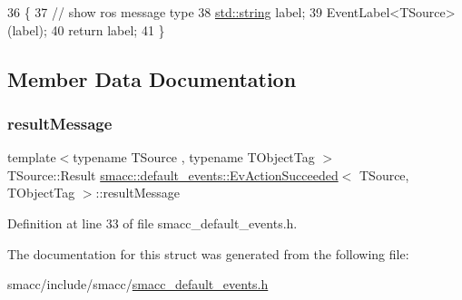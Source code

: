 \begin{DoxyCode}
36   \{
37     \textcolor{comment}{// show ros message type}
38     \hyperlink{namespacetesting_1_1internal_a8e8ff5b11e64078831112677156cb111}{std::string} label;
39     EventLabel<TSource>(label);
40     \textcolor{keywordflow}{return} label;
41   \}
\end{DoxyCode}


\subsection{Member Data Documentation}
\mbox{\label{structsmacc_1_1default__events_1_1EvActionSucceeded_a5178997ebcf9a7a738e0bda57bd658d1}} 
\subsubsection{\texorpdfstring{result\+Message}{resultMessage}}
{\footnotesize\ttfamily template$<$typename T\+Source , typename T\+Object\+Tag $>$ \\
T\+Source\+::\+Result \hyperlink{structsmacc_1_1default__events_1_1EvActionSucceeded}{smacc\+::default\+\_\+events\+::\+Ev\+Action\+Succeeded}$<$ T\+Source, T\+Object\+Tag $>$\+::result\+Message}



Definition at line 33 of file smacc\+\_\+default\+\_\+events.\+h.



The documentation for this struct was generated from the following file\+:\begin{DoxyCompactItemize}
\item 
smacc/include/smacc/\hyperlink{smacc__default__events_8h}{smacc\+\_\+default\+\_\+events.\+h}\end{DoxyCompactItemize}
